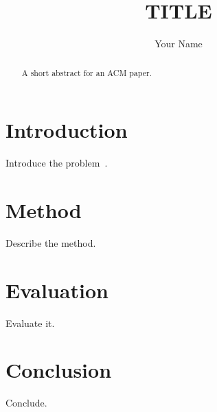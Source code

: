 \documentclass[sigconf]{acmart}
\begin{document}
\title{{{TITLE}}}

\author{Your Name}

\begin{abstract}
A short abstract for an ACM paper.
\end{abstract}


\maketitle

\section{Introduction}
Introduce the problem~\cite{knuth1984}.

\section{Method}
Describe the method.

\section{Evaluation}
Evaluate it.

\section{Conclusion}
Conclude.



\end{document}
